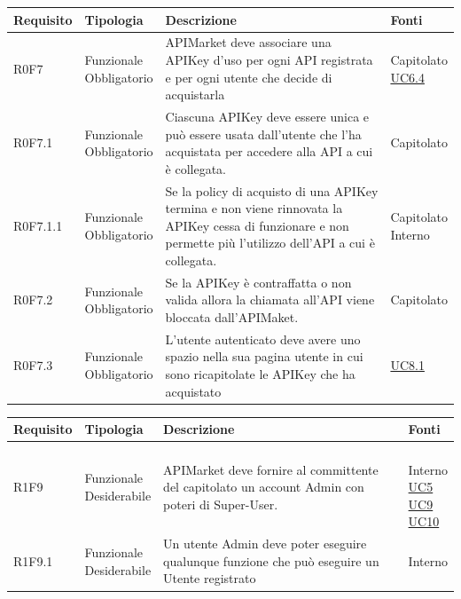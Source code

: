 \documentclass[12pt,a4paper,titlepage]{article}
\newcommand{\minitab}[2][1]{\begin{tabular}#1 #2\end{tabular}}
\newcommand{\uc}[1]{\hyperref[UC#1]{UC#1}}
\begin{document}
{\begin{longtable}{|m{5em}|m{6em}|m{28em}|m{5em}|}
			\hline
		\end{longtable}
		\begin{longtable}{|m{5em}|m{6em}|m{28em}|m{5em}|}
			\hline
			\textbf{Requisito} & \textbf{Tipologia}  & \textbf{Descrizione} & \textbf{Fonti} \\
			\hline
			R0F7 & \minitab[c]{Funzionale\\Obbligatorio} & APIMarket deve associare una APIKey d'uso per ogni API registrata e per ogni utente che decide di acquistarla & \shortstack[l]{Capitolato\\\uc{6.4}}\\
			\hline
			R0F7.1 & \minitab[c]{Funzionale\\Obbligatorio} & Ciascuna APIKey deve essere unica e può essere usata dall'utente che l'ha acquistata per accedere alla API a cui è collegata. & Capitolato\\
			\hline
			R0F7.1.1 & \minitab[c]{Funzionale\\Obbligatorio} & Se la policy di acquisto di una APIKey termina e non viene rinnovata la APIKey cessa di funzionare e non permette più l'utilizzo dell'API a cui è collegata. & \shortstack[l]{Capitolato \\ Interno}\\
			\hline
			R0F7.2 & \minitab[c]{Funzionale\\Obbligatorio} & Se la APIKey è contraffatta o non valida allora la chiamata all'API viene bloccata dall'APIMaket. & Capitolato\\
			\hline
			R0F7.3 & \minitab[c]{Funzionale\\Obbligatorio} & L'utente autenticato deve avere uno spazio nella sua pagina utente in cui sono ricapitolate le APIKey che ha acquistato & \uc{8.1}\\
			\hline
		\end{longtable}
		\begin{longtable}{|m{5em}|m{6em}|m{28em}|m{5em}|}
			\hline
			\textbf{Requisito} & \textbf{Tipologia}  & \textbf{Descrizione} & \textbf{Fonti} \\
			\hline
			R1F9 & \minitab[c]{Funzionale\\Desiderabile} & APIMarket deve fornire al committente del capitolato un account Admin con poteri di Super-User. & \shortstack[l]{\\Interno\\\uc{5}\\\uc{9}\\\uc{10}}\\
			\hline
			R1F9.1 & \minitab[c]{Funzionale\\Desiderabile} & Un utente Admin deve poter eseguire qualunque funzione che può eseguire un Utente registrato & Interno\\

\end{longtable}}
\end{document}
